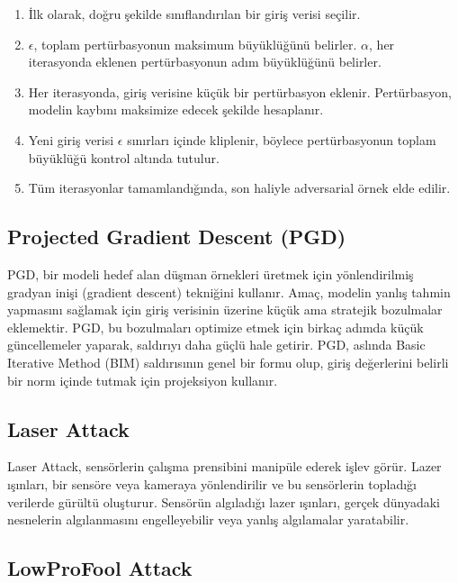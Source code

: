 \begin{enumerate}
    \item İlk olarak, doğru şekilde sınıflandırılan bir giriş verisi seçilir.
    \item $\epsilon$, toplam pertürbasyonun maksimum büyüklüğünü belirler. $\alpha$, her iterasyonda eklenen pertürbasyonun adım büyüklüğünü belirler.
    \item Her iterasyonda, giriş verisine küçük bir pertürbasyon eklenir. Pertürbasyon, modelin kaybını maksimize edecek şekilde hesaplanır.
    \item Yeni giriş verisi $\epsilon$ sınırları içinde kliplenir, böylece pertürbasyonun toplam büyüklüğü kontrol altında tutulur.
    \item Tüm iterasyonlar tamamlandığında, son haliyle adversarial örnek elde edilir.
\end{enumerate}

\newpage

\subsection{Projected Gradient Descent (PGD)}

PGD, bir modeli hedef alan düşman örnekleri üretmek için yönlendirilmiş gradyan inişi (gradient descent) tekniğini kullanır. Amaç, modelin yanlış tahmin yapmasını sağlamak için giriş verisinin üzerine küçük ama stratejik bozulmalar eklemektir. PGD, bu bozulmaları optimize etmek için birkaç adımda küçük güncellemeler yaparak, saldırıyı daha güçlü hale getirir. PGD, aslında Basic Iterative Method (BIM) saldırısının genel bir formu olup, giriş değerlerini belirli bir norm içinde tutmak için projeksiyon kullanır.

\newpage

\subsection{Laser Attack}

Laser Attack, sensörlerin çalışma prensibini manipüle ederek işlev görür. Lazer ışınları, bir sensöre veya kameraya yönlendirilir ve bu sensörlerin topladığı verilerde gürültü oluşturur. Sensörün algıladığı lazer ışınları, gerçek dünyadaki nesnelerin algılanmasını engelleyebilir veya yanlış algılamalar yaratabilir.

\newpage

\subsection{LowProFool Attack}

